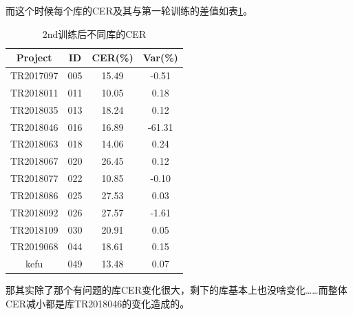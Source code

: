 而这个时候每个库的CER及其与第一轮训练的差值如表\ref{tab:second-each}。
\begin{table}[h]
 \centering
 \caption{2nd训练后不同库的CER}
	 \begin{tabular*}{1\textwidth}{@{\extracolsep{\fill}}cccc}
	 \toprule
		{\bf Project   } & {\bf ID   }  & {\bf CER(\%)   } & {\bf Var(\%) }\\
	 \midrule
		TR2017097 &	005  &  15.49   &  -0.51  \\
		TR2018011 &	011  &  10.05   &   0.18   \\
		TR2018035 &	013  &  18.24   &   0.12   \\
		TR2018046 &	016  &  16.89   &  -61.31    \\
		TR2018063 &	018  &  14.06   &   0.24   \\
		TR2018067 &	020  &  26.45   &   0.12   \\
		TR2018077 &	022  &  10.85   &  -0.10   \\
		TR2018086 &	025  &  27.53   &   0.03   \\
		TR2018092 &	026  &  27.57   &  -1.61   \\
		TR2018109 &	030  &  20.91   &   0.05    \\
		TR2019068 &	044  &  18.61   &   0.15   \\
		kefu      &	049  &  13.48   &   0.07   \\
	 \bottomrule
	 \end{tabular*}%
 \label{tab:second-each}%
\end{table}%

那其实除了那个有问题的库CER变化很大，剩下的库基本上也没啥变化……而整体CER减小都是库TR2018046的变化造成的。

